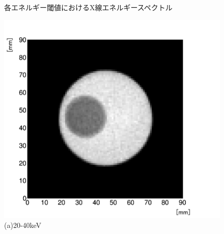 \begin{figure}[H]
\begin{minipage}{0.5\hsize}
 \vspace{-1cm}
 \end{minipage}
 \begin{center}
  \caption{各エネルギー閾値におけるX線エネルギースペクトル}
  \label{fig:spectrum_low}
  \end{center}
\end{figure}


\begin{figure}[H]
 \begin{minipage}{0.5\hsize}
  \begin{center}
   \includegraphics[bb=0.000000 0.000000 586.511515 539.955364,width=1.0\hsize]{image2/chapter5/low_contrast_20-40.png}
  \end{center}  
\vspace{-1cm}
\caption*{(a)20-40keV}
 \end{minipage}
 \begin{minipage}{0.5\hsize}
  \begin{center}

\end{center}
\end{minipage}
\end{figure}
